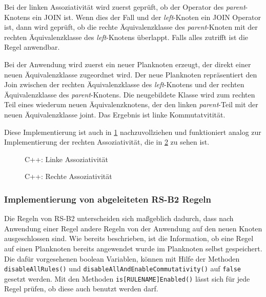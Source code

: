 Bei der linken Assoziativität wird zuerst geprüft, ob der Operator des \textit{parent}-Knotens ein JOIN ist. Wenn dies der Fall und der \textit{left}-Knoten ein JOIN Operator ist, dann wird geprüft, ob die rechte Äquivalenzklasse des \textit{parent}-Knoten mit der rechten Äquivalenzklasse des \textit{left}-Knotens überlappt. Falls alles zutrifft ist die Regel anwendbar.

Bei der Anwendung wird zuerst ein neuer Planknoten erzeugt, der direkt einer neuen Äquivalenzklasse zugeordnet wird. Der neue Planknoten repräsentiert den Join zwischen der rechten Äquivalenzklasse des \textit{left}-Knotens und der rechten Äquivalenzklasse des \textit{parent}-Knotens. Die neugebildete Klasse wird zum rechten Teil eines wiederum neuen Äquivalenzknotens, der den linken \textit{parent}-Teil mit der neuen Äquivalenzklasse joint. Das Ergebnis ist linke Kommutatvitität.

Diese Implementierung ist auch in \ref{LeftAssociativityCode} nachzuvollziehen und funktioniert analog zur Implementierung der rechten Assoziativität, die in \ref{RightAssociativityCode} zu sehen ist.


\begin{figure}[ht]

\caption{C++: Linke Assoziativität}
\label{LeftAssociativityCode}
\end{figure}

\begin{figure}[ht]

\caption{C++: Rechte Assoziativität}
\label{RightAssociativityCode}
\end{figure}




\subsubsection{Implementierung von abgeleiteten RS-B2 Regeln}

Die Regeln von RS-B2 unterscheiden sich maßgeblich dadurch, dass nach Anwendung einer Regel andere Regeln von der Anwendung auf den neuen Knoten ausgeschlossen sind. Wie bereits beschrieben, ist die Information, ob eine Regel auf einen Planknoten bereits angewendet wurde im Planknoten selbst gespeichert. Die dafür vorgesehenen boolean Variablen, können mit Hilfe der Methoden \texttt{disable\-All\-Rules()} und \texttt{disable\-All\-And\-Enable\-Commutativity()} auf \texttt{false} gesetzt werden. Mit den Methoden \texttt{is[RULENAME]Enabled()} lässt sich für jede Regel prüfen, ob diese auch benutzt werden darf.

